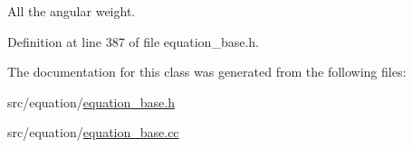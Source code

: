 All the angular weight. 



Definition at line 387 of file equation\+\_\+base.\+h.



The documentation for this class was generated from the following files\+:\begin{DoxyCompactItemize}
\item 
src/equation/\hyperlink{equation__base_8h}{equation\+\_\+base.\+h}\item 
src/equation/\hyperlink{equation__base_8cc}{equation\+\_\+base.\+cc}\end{DoxyCompactItemize}

